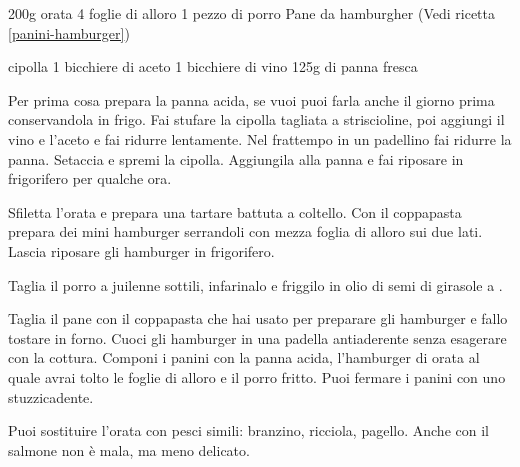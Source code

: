 \begin{ingreds}
	200g orata
	4 foglie di alloro
	1 pezzo di porro
	Pane da hamburgher (Vedi ricetta \ref{panini-hamburger})
	
\columnbreak
{} cipolla
	1 bicchiere di aceto
	1 bicchiere di vino
	125g di panna fresca
\end{ingreds}

\begin{method}
Per prima cosa prepara la panna acida, se vuoi puoi farla anche il giorno prima conservandola in frigo. Fai stufare la cipolla tagliata a striscioline, poi aggiungi il vino e l'aceto e fai ridurre lentamente. Nel frattempo in un padellino fai ridurre la panna. Setaccia e spremi la cipolla. Aggiungila alla panna e fai riposare in frigorifero per qualche ora.

Sfiletta l'orata e prepara una tartare battuta a coltello. Con il coppapasta prepara dei mini hamburger serrandoli con mezza foglia di alloro sui due lati. Lascia riposare gli hamburger in frigorifero.

Taglia il porro a juilenne sottili, infarinalo e friggilo in olio di semi di girasole a .

Taglia il pane con il coppapasta che hai usato per preparare gli hamburger e fallo tostare in forno. Cuoci gli hamburger in una padella antiaderente senza esagerare con la cottura. Componi i panini con la panna acida, l'hamburger di orata al quale avrai tolto le foglie di alloro e il porro fritto. Puoi fermare i panini con uno stuzzicadente.
\end {method}
	\begin{note}
		Puoi sostituire l'orata con pesci simili: branzino, ricciola, pagello. Anche con il salmone non è mala, ma meno delicato.
	\end{note}
